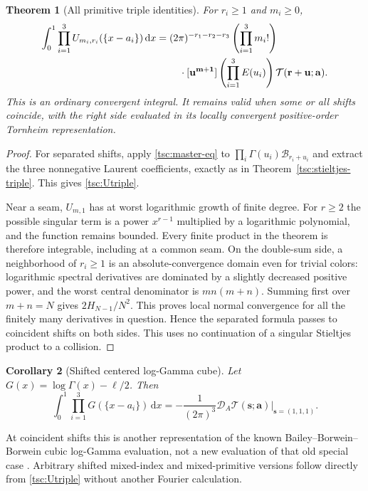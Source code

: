 \documentclass[11pt]{article}
\numberwithin{equation}{section}
\newtheorem{theorem}{Theorem}[section]
\newtheorem{corollary}[theorem]{Corollary}
\theoremstyle{definition}\newtheorem{definition}[theorem]{Definition}
\theoremstyle{remark}\newtheorem{remark}[theorem]{Remark}
\newcommand{\dd}{\,\mathrm d}
\newcommand{\calB}{\mathcal B}
\newcommand{\calT}{\mathcal T}
\begin{document}
\begin{theorem}[All primitive triple identities]\label{tsc:primitive-triple}
For $r_i\ge1$ and $m_i\ge0$,
\begin{align}\label{tsc:Utriple}
 \int_0^1\prod_{i=1}^3U_{m_i,r_i}(\{x-a_i\})\dd x
 ={}&(2\pi)^{-r_1-r_2-r_3}\left(\prod_{i=1}^3m_i!\right)\notag\\
 &\quad\cdot[\mathbf u^{\mathbf m+\mathbf1}]
     \left(\prod_{i=1}^3E(u_i)\right)
                         \calT(\mathbf r+\mathbf u;\mathbf a).
\end{align}
This is an ordinary convergent integral. It remains valid when some or all
shifts coincide, with the right side evaluated in its locally convergent
positive-order Tornheim representation.
\end{theorem}
\begin{proof}
For separated shifts, apply \eqref{tsc:master-eq} to
$\prod_i\Gamma(u_i)\calB_{r_i+u_i}$ and extract the three nonnegative
Laurent coefficients, exactly as in Theorem~\ref{tsc:stieltjes-triple}.
This gives \eqref{tsc:Utriple}.

Near a seam, $U_{m,1}$ has at worst logarithmic growth of finite degree.
For $r\ge2$ the possible singular term is a power $x^{r-1}$ multiplied
by a logarithmic polynomial, and the function remains bounded. Every
finite product in the theorem is therefore integrable, including at a
common seam. On the double-sum side, a neighborhood of $r_i\ge1$ is an
absolute-convergence domain even for trivial colors: logarithmic
spectral derivatives are dominated by a slightly decreased positive power,
and the worst central denominator is $mn(m+n)$. Summing first over
$m+n=N$ gives $2H_{N-1}/N^2$. This proves local normal convergence for
all the finitely many derivatives in question. Hence the separated formula
passes to coincident shifts on both sides. This uses no continuation of a
singular Stieltjes product to a collision.
\end{proof}

\begin{corollary}[Shifted centered log-Gamma cube]\label{tsc:loggamma-triple}
Let $G(x)=\log\Gamma(x)-\ell/2$. Then
\begin{equation}\label{tsc:Gtriple}
 \int_0^1\prod_{i=1}^3G(\{x-a_i\})\dd x
   =-\frac1{(2\pi)^3}
       \left.\mathscr D_A\calT(\mathbf s;\mathbf a)\right|_{\mathbf s=(1,1,1)}.
\end{equation}
\end{corollary}
At coincident shifts this is another representation of the known
Bailey--Borwein--Borwein cubic log-Gamma evaluation, not a new evaluation
of that old special case \cite{tsc:bbb,tsc:gamma-chapter}. Arbitrary shifted
mixed-index and mixed-primitive versions follow directly from
\eqref{tsc:Utriple} without another Fourier calculation.
\end{document}
